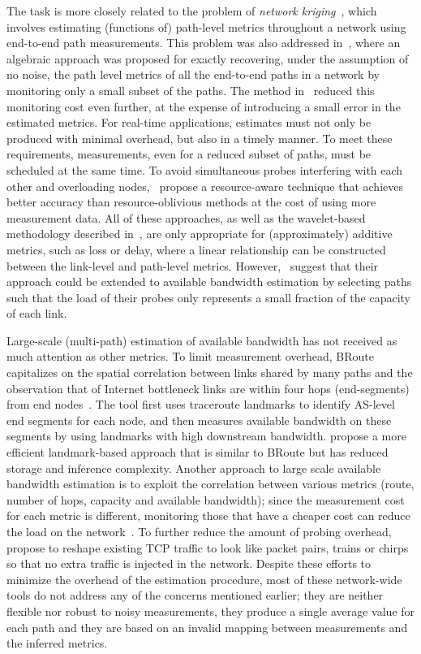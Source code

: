 \documentclass[final,5p,times,twocolumn]{elsarticle}
\begin{document}
The task is more closely related to the problem of {\em network kriging}~\cite{chu:06}, which involves estimating (functions of) path-level metrics throughout a network using end-to-end path measurements. This problem was also addressed in~\cite{che:03,che:07algebra}, where an algebraic approach was proposed for exactly recovering, under the assumption of no noise, the path level metrics of all the end-to-end paths in a network by monitoring only a small subset of the paths. The method in~\cite{chu:06} reduced this monitoring cost even further, at the expense of introducing a small error in the estimated metrics.  
For real-time applications, estimates must not only be produced with minimal overhead, but also in a timely manner.  To meet these requirements, measurements, even for a reduced subset of paths, must be scheduled at the same time.  
To avoid simultaneous probes interfering with each other and overloading nodes,~\citet{son:07} propose a resource-aware technique that achieves better accuracy than resource-oblivious methods at the cost of using more measurement data.
All of these approaches, as well as the wavelet-based methodology described in~\cite{coa:07}, are only appropriate for (approximately) additive metrics, such as loss or delay, where a linear relationship can be constructed between the link-level and path-level metrics.
However,~\citet{son:07} suggest that their approach could be extended to available bandwidth estimation by selecting paths such that the load of their probes only represents a small fraction of the capacity of each link.



Large-scale (multi-path) estimation of available bandwidth has not received as much attention as other metrics.
To limit measurement overhead, BRoute~\cite{hu:05} capitalizes on the spatial correlation between links shared by many paths and the observation that  of Internet bottleneck links are within four hops (end-segments) from end nodes~\cite{hu:04}.  The tool first uses traceroute landmarks to identify AS-level end segments for each node, and then measures available bandwidth on these segments
by using landmarks with high downstream bandwidth.  \citet{man:07bandwidth} propose a more efficient landmark-based approach that is similar to BRoute but has reduced storage and inference complexity.
Another approach to large scale available bandwidth estimation is to exploit the correlation between various metrics (route, number of hops, capacity and available bandwidth); since the measurement cost for each metric is different, monitoring those that have a cheaper cost can reduce the load on the network~\cite{yal:08}.  
To further reduce the amount of probing overhead,~\citet{man:07inferring} propose to reshape existing TCP traffic to look like packet pairs, trains or chirps so that no extra traffic is injected in the network.  
Despite these efforts to minimize the overhead of the estimation procedure, most of these network-wide tools do not address any of the concerns mentioned earlier; they are neither flexible nor robust to noisy measurements, they produce a single average value for each path and they are based on an invalid mapping between measurements and the inferred metrics.
\end{document}
